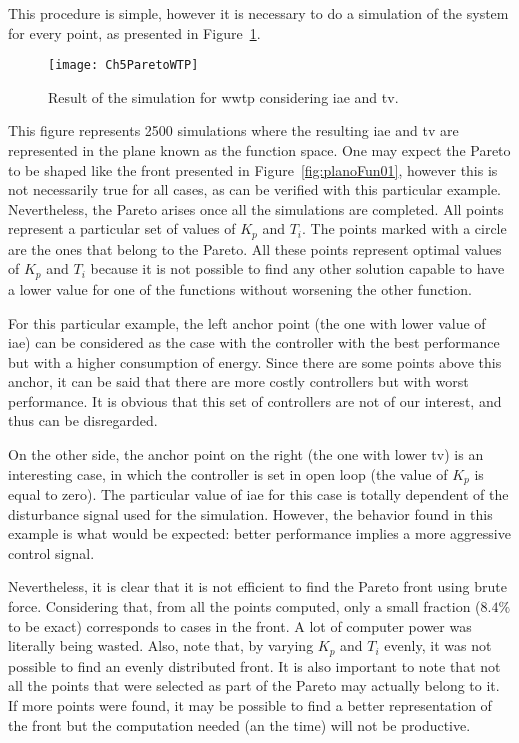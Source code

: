 This procedure is simple, however it is necessary to do a simulation of the system for every point, as presented in Figure~\ref{fig:Ch5ParetoWTP}. %
\begin{figure}[tb]
	\centering
	\texttt{[image: Ch5ParetoWTP]}
	\caption{Result of the simulation for \gls{wwtp} considering \gls{iae} and \gls{tv}.}
	\label{fig:Ch5ParetoWTP}
\end{figure}
%
This figure represents 2500 simulations where the resulting \gls{iae} and \gls{tv} are represented in the plane known as the function space. One may expect the Pareto to be shaped like the front presented in Figure~\ref{fig:planoFun01}, however this is not necessarily true for all cases, as can be verified with this particular example. Nevertheless, the Pareto arises once all the simulations are completed. All points represent a particular set of values of $K_p$ and $T_i$. The points marked with a circle are the ones that belong to the Pareto. All these points represent optimal values of $K_p$ and $T_i$ because it is not possible to find any other solution capable to have a lower value for one of the functions without worsening the other function.

For this particular example, the left anchor point (the one with lower value of \gls{iae}) can be considered as the case with the controller with the best performance but with a higher consumption of energy. Since there are some points above this anchor, it can be said that there are more costly controllers but with worst performance. It is obvious that this set of controllers are not of our interest, and thus can be disregarded.

On the other side, the anchor point on the right (the one with lower \gls{tv}) is an interesting case, in which the controller is set in open loop (the value of $K_p$ is equal to zero). The particular value of \gls{iae} for this case is totally dependent of the disturbance signal used for the simulation. However, the behavior found in this example is what would be expected: better performance implies a more aggressive control signal.

Nevertheless, it is clear that it is not efficient to find the Pareto front using brute force. Considering that, from all the points computed, only a small fraction ($8.4\%$ to be exact) corresponds to cases in the front. A lot of computer power was literally being wasted. Also, note that, by varying $K_p$ and $T_i$ evenly, it was not possible to find an evenly distributed front. It is also important to note that not all the points that were selected as part of the Pareto may actually belong to it. If more points were found, it may be possible to find a better representation of the front but the computation needed (an the time) will not be productive.

